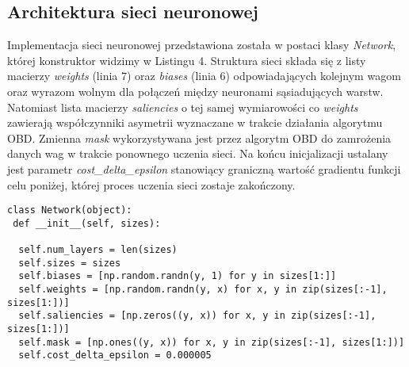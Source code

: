 \subsection{Architektura sieci neuronowej}
Implementacja sieci neuronowej przedstawiona została w postaci klasy \emph{Network}, której konstruktor widzimy w Listingu 4. Struktura sieci składa się z listy macierzy \emph{weights} (linia 7) oraz \emph{biases} (linia 6) odpowiadających kolejnym wagom oraz wyrazom wolnym dla połączeń między neuronami sąsiadujących warstw. Natomiast lista macierzy \emph{saliencies} o tej samej wymiarowości co \emph{weights} zawierają współczynniki asymetrii wyznaczane w trakcie działania algorytmu OBD. Zmienna \emph{mask} wykorzystywana jest przez algorytm OBD do zamrożenia danych wag w trakcie ponownego uczenia sieci. Na końcu inicjalizacji ustalany jest parametr \emph{cost{\_}delta{\_}epsilon} stanowiący graniczną wartość gradientu funkcji celu poniżej, której proces uczenia sieci zostaje zakończony.  
  
\begin{listing}[!htb]
\begin{verbatim}
class Network(object):
 def __init__(self, sizes):
 
  self.num_layers = len(sizes)
  self.sizes = sizes
  self.biases = [np.random.randn(y, 1) for y in sizes[1:]]
  self.weights = [np.random.randn(y, x) for x, y in zip(sizes[:-1], sizes[1:])]
  self.saliencies = [np.zeros((y, x)) for x, y in zip(sizes[:-1], sizes[1:])]
  self.mask = [np.ones((y, x)) for x, y in zip(sizes[:-1], sizes[1:])]
  self.cost_delta_epsilon = 0.000005
\end{verbatim}
\end{listing}

